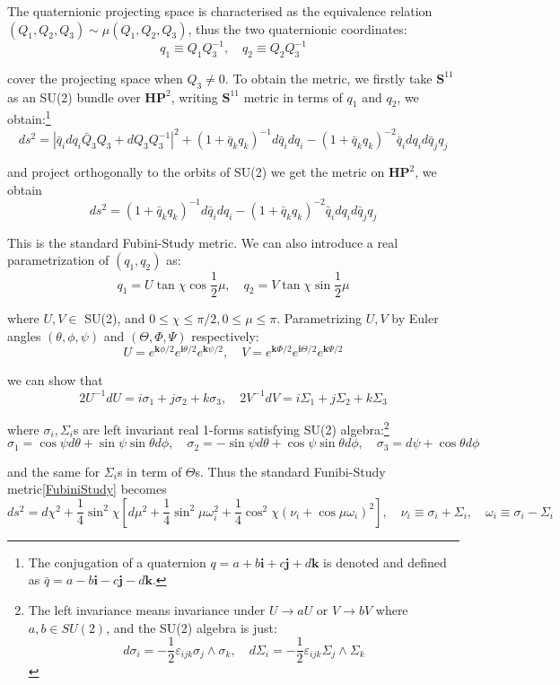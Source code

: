 \documentclass[12pt, a4paper]{article}
\numberwithin{equation}{section}
\newcommand{\be}{\begin{equation}}
\newcommand{\ee}{\end{equation}}
\begin{document}
	The quaternionic projecting space is characterised as the equivalence relation $(Q_1, Q_2, Q_3)\sim\mu(Q_1, Q_2, Q_3)$, thus the two quaternionic coordinates:
\be
	q_1 \equiv Q_1Q_3^{-1},\quad q_2 \equiv Q_2Q_3^{-1}
\ee

	cover the projecting space when $Q_3 \ne 0$. To obtain the metric, we firstly take $\mathbf{S}^{11}$ as an SU(2) bundle over $\mathbf{HP}^2$, writing $\mathbf{S}^{11}$ metric in terms of $q_1$ and $q_2$, we obtain:\footnote{The conjugation of a quaternion $q = a + b\textbf{i} + c\textbf{j}+ d\textbf{k}$ is denoted and defined as $\bar{q} = a - b\textbf{i} - c\textbf{j} - d\textbf{k}$. }\cite{Duff:1986}
\be
	ds^2 = |\bar{q}_i dq_i \bar{Q}_3 Q_3 + dQ_3 Q_3^{-1}|^2 + (1+\bar{q}_kq_k)^{-1} d\bar{q}_i dq_i - (1+ \bar{q}_kq_k)^{-2}\bar{q}_i dq_i d\bar{q}_j q_j
\ee

	and project orthogonally to the orbits of SU(2) we get the metric on $\mathbf{HP}^2$, we obtain
\be
	ds^2 = (1+\bar{q}_kq_k)^{-1} d\bar{q}_i dq_i - (1+\bar{q}_kq_k)^{-2}\bar{q}_idq_id\bar{q}_jq_j
	\label{FubiniStudy}
\ee

	This is the standard Fubini-Study metric. We can also introduce a real parametrization of $(q_1, q_2)$ as:
\be
	q_1 = U\tan\chi \cos\frac{1}{2}\mu,\quad q_2 = V\tan\chi\sin\frac{1}{2}\mu
\ee
	
	where $U, V\in$ SU(2), and $0\le \chi\le\pi/2, 0\le \mu\le\pi$. Parametrizing $U, V$ by Euler angles $(\theta, \phi, \psi)$ and $(\Theta, \Phi, \Psi)$ respectively:
\be
	U = e^{\textbf{k}\phi/2} e^{\textbf{i}\theta/2} e^{\textbf{k}\psi/2},\quad 
	V = e^{\textbf{k}\Phi/2} e^{\textbf{i}\Theta/2} e^{\textbf{k}\Psi/2}
\ee

	we can show that
\be
	2U^{-1}dU = i\sigma_1 + j\sigma_2 + k\sigma_3,\quad 2V^{-1}dV = i\Sigma_1 +j\Sigma_2 +k\Sigma_3	
\ee

	where $\sigma_i, \Sigma_i$s are left invariant real 1-forms satisfying SU(2) algebra:\footnote{The left invariance means invariance under $U\rightarrow aU$ or $V\rightarrow bV$ where $a,b\in SU(2)$, and the SU(2) algebra is just:
		\be
		d\sigma_i = -\frac{1}{2}\varepsilon_{ijk}\sigma_j \wedge \sigma_k,\quad d\Sigma_i  = -\frac{1}{2}\varepsilon_{ijk} \Sigma_j \wedge \Sigma_k
		\ee
	}
\be
	\sigma_1 = \cos\psi d\theta + \sin\psi\sin\theta d\phi,\quad \sigma_2 = -\sin\psi d\theta + \cos\psi\sin\theta d\phi,\quad \sigma_3 = d\psi + \cos\theta d\phi
\ee

	and the same for $\Sigma_i$s in term of $\Theta$s. Thus the standard Funibi-Study metric\ref{FubiniStudy} becomes
\be
	ds^2 = d\chi^2 + \frac{1}{4}\sin^2\chi[d\mu^2 + \frac{1}{4}\sin^2\mu \omega_i^2 + \frac{1}{4}\cos^2\chi(\nu_i + \cos\mu \omega_i)^2],\quad \nu_i\equiv \sigma_i + \Sigma_i,\quad \omega_i \equiv \sigma_i - \Sigma_i
\ee
\end{document}
